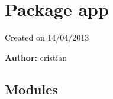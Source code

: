%
%
%


\section{Package app}

    \label{app}
Created on 14/04/2013

\textbf{Author:} cristian





\subsection{Modules}


